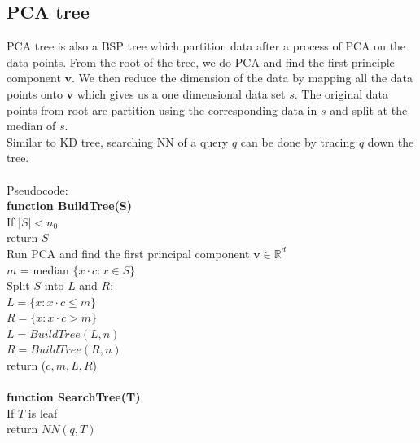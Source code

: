 \documentclass[paper=letter, fontsize=12pt]{article} %
\begin{document}
\subsection{PCA tree}
PCA tree is also a BSP tree which partition data after a process of PCA on the data points. From the root of the tree, we do PCA and find the first principle component $\mathbf{v}$. We then reduce the dimension of the data by mapping all the data points onto $\mathbf{v}$ which gives us a one dimensional data set $s$. The original data points from root are partition using the corresponding data in $s$ and split at the median of $s$.\\
Similar to KD tree, searching NN of a query $q$ can be done by tracing $q$ down the tree.
\\~\\
Pseudocode:\\
\hspace*{1em} \textbf{function BuildTree(S)}\\
\hspace*{2em} If $|S| < n_0$\\
\hspace*{3em} return $S$\\
\hspace*{2em} Run PCA and find the first principal component $\mathbf{v} \in \mathbb{R}^d$\\
\hspace*{2em} $m$ = median $\{x \cdot c: x\in S\}$\\
\hspace*{2em} Split $S$ into $L$ and $R$:\\
\hspace*{3em} $L = \{x: x\cdot c \leq m\}$\\
\hspace*{3em} $R = \{x: x\cdot c > m\}$\\
\hspace*{2em} $L = BuildTree(L, n)$\\
\hspace*{2em} $R = BuildTree(R, n)$\\
\hspace*{2em} return ($c, m, L, R$)\\~\\
\hspace*{1em} \textbf{function SearchTree(T)}\\
\hspace*{2em} If $T$ is leaf\\
\hspace*{3em} return $NN(q, T)$\\
\end{document}
